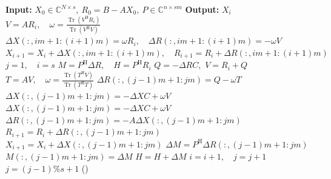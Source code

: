 \par{}
\begin{Remark}\label{rem:block-idr-bicgstab-equivalence}
\end{Remark}
\begin{algorithm}[H]\caption{}\label{alg:block-idr}\begin{algorithmic}[1]
\Statex\textbf{Input:} $X_0\in\mathbb C^{N\times s},\ R_0=B-AX_0,\ P\in\mathbb C^{n\times sm}$
\Statex\textbf{Output:} $X_i$
\State $V=AR_i,\quad\omega=\frac{\operatorname{Tr}(V^{\mathrm H}R_i)}{\operatorname{Tr}(V^{\mathrm H}V)}$
\State $\Delta X(:,im+1:(i+1)m)=\omega R_i,\quad\Delta R(:,im+1:(i+1)m)=-\omega V$
\State $X_{i+1}=X_i+\Delta X(:,im+1:(i+1)m),\quad R_{i+1}=R_i+\Delta R(:,im+1:(i+1)m)$
\EndFor
\State $j=1,\quad i=s$
\State $M=P^{\mathrm H}\Delta R,\quad H=P^{\mathrm H}R_i$
\State{}
\State $Q=-\Delta RC,$
\State $V=R_i+Q$
\State $T=AV,\quad\omega=\frac{\operatorname{Tr}(T^{\mathrm H}V)}{\operatorname{Tr}(T^{\mathrm H}T)}$
\State $\Delta R(:,(j-1)m+1:jm)=Q-\omega T$
\State $\Delta X(:,(j-1)m+1:jm)=-\Delta XC+\omega V$
\Else
\State $\Delta X(:,(j-1)m+1:jm)=-\Delta XC+\omega V$
\State $\Delta R(:,(j-1)m+1:jm)=-A\Delta X(:,(j-1)m+1:jm)$
\EndIf
\State $R_{i+1}=R_i+\Delta R(:,(j-1)m+1:jm)$
\State $X_{i+1}=X_i+\Delta X(:,(j-1)m+1:jm)$
\State $\Delta M=P^{\mathrm H}\Delta R(:,(j-1)m+1:jm)$
\State $M(:,(j-1)m+1:jm)=\Delta M$
\State $H=H+\Delta M$
\State $i=i+1,\quad j=j+1$
\State $j=(j-1)\%s+1$ ()
\EndFor\EndWhile\end{algorithmic}\end{algorithm}
